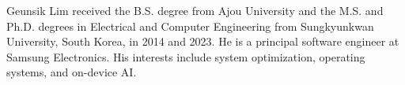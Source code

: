

\begin{IEEEbiographynophoto}{Geunsik Lim}
received the B.S. degree from Ajou University and the M.S. and Ph.D. degrees in Electrical and Computer Engineering from Sungkyunkwan University, South Korea, in 2014 and 2023. He is a principal software engineer at Samsung Electronics. His interests include system optimization, operating systems, and on-device AI.
\end{IEEEbiographynophoto}
